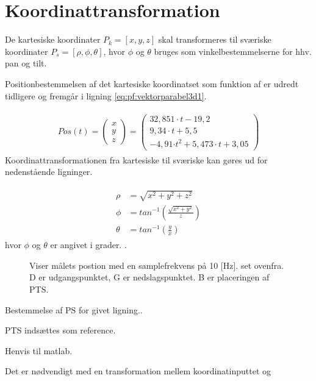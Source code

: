 \section{Koordinattransformation}
\label{sec:koordinattransformation}

De kartesiske koordinater \(P_k=[x, y, z]\) skal transformeres til sværiske koordinater \(P_s=[\rho, \phi, \theta]\), hvor \(\phi\) og \(\theta\) bruges som vinkelbestemmelserne for hhv. pan og tilt.\\ 

Positionbestemmelsen af det kartesiske koordinatset som funktion af er udredt tidligere og fremgår i ligning \ref{eq:pf:vektorparabel3d1}. 

\begin{align}
\begin{split}
Pos\left( t \right) =\left( \begin{matrix} x \\ y \\ z \end{matrix} \right) =\left( \begin{matrix} 32,851\cdot t-19,2 \\ 9,34\cdot t+5,5 \\ -4,91{ \cdot t }^{ 2 }+5,473\cdot t+3,05 \end{matrix} \right) 
\label{eq:pf:vektorparabel3d1}
\end{split}
\end{align}
Koordinattransformationen fra kartesiske til sværiske kan gøres ud for nedenstående ligninger.


\begin{align}
\begin{split}
\rho &=\sqrt { { x }^{ 2 } +{ y }^{ 2 }+{ z }^{ 2 }} 
\\
\phi &={ tan }^{ -1 }\left( \frac { \sqrt { { x }^{ 2 }+{ y }^{ 2 } }  }{ z }  \right) 
\\
\theta &={ tan }^{ -1 }\left( \frac { y }{ x }  \right) 
\label{eq:sv_koordi}
\end{split}
\end{align}
hvor \(\phi\) og \(\theta\) er angivet i grader. \citep[Kap. 10.6, s. 598]{adam}.

\begin{figure}[!th]
\centering
\begin{tikzpicture}[scale=2]

\end{tikzpicture}
\caption[tekst i indholdsfortegnelsen]{Viser målets postion med en samplefrekvens på 10 [Hz].  set ovenfra. D er udgangspunktet, G er nedslagspunktet. B er placeringen af PTS.}
\label{fig:para_in_xy_plane}
\end{figure}




\bigskip



Bestemmelse af PS for givet ligning..


PTS indsættes som reference. 

Henvis til matlab. 




Det er nødvendigt med en transformation mellem koordinatinputtet og 

